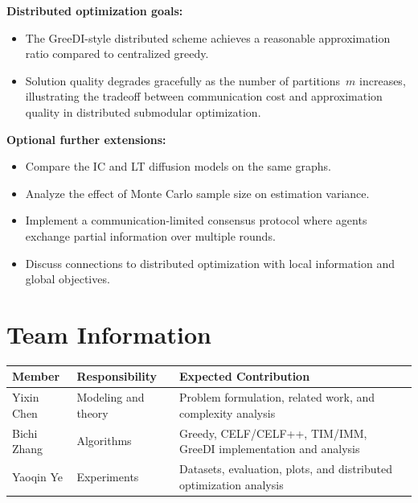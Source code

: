 \documentclass[10pt]{article}
\begin{document}
\textbf{Distributed optimization goals:}
\begin{itemize}
    \item The GreeDI-style distributed scheme achieves a reasonable
    approximation ratio compared to centralized greedy.
    \item Solution quality degrades gracefully as the number of partitions~$m$
    increases, illustrating the tradeoff between communication cost and
    approximation quality in distributed submodular optimization.
\end{itemize}

\textbf{Optional further extensions:}
\begin{itemize}
    \item Compare the IC and LT diffusion models on the same graphs.
    \item Analyze the effect of Monte Carlo sample size on estimation variance.
    \item Implement a communication-limited consensus protocol where agents
    exchange partial information over multiple rounds.
    \item Discuss connections to distributed optimization with local
    information and global objectives.
\end{itemize}

\section{Team Information}

\begin{tabular}{@{}lll@{}}
\toprule
Member & Responsibility & Expected Contribution \\
\midrule
Yixin Chen & Modeling and theory & Problem formulation, related work, and complexity analysis \\
Bichi Zhang & Algorithms & Greedy, CELF/CELF++, TIM/IMM, GreeDI implementation and analysis \\
Yaoqin Ye & Experiments & Datasets, evaluation, plots, and distributed optimization analysis \\
\bottomrule
\end{tabular}

\begin{footnotesize}


\end{footnotesize}
\end{document}
